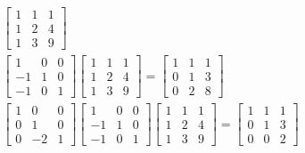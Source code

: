 \begin{gather*}
\left[ \begin{array}{ccc} 1 & 1 & 1 \\ 1 & 2 & 4 \\ 1 & 3 & 9 \end{array} \right] \\
\left[ \begin{array}{ccc} 1 & 0 & 0 \\ -1 & 1 & 0 \\ -1 & 0 & 1 \end{array} \right]
\left[ \begin{array}{ccc} 1 & 1 & 1 \\ 1 & 2 & 4 \\ 1 & 3 & 9 \end{array} \right]
= \left[ \begin{array}{ccc} 1 & 1 & 1 \\ 0 & 1 & 3 \\ 0 & 2 & 8 \end{array} \right] \\
\left[ \begin{array}{ccc} 1 & 0 & 0 \\ 0 & 1 & 0 \\ 0 & -2 & 1 \end{array} \right]
\left[ \begin{array}{ccc} 1 & 0 & 0 \\ -1 & 1 & 0 \\ -1 & 0 & 1 \end{array} \right]
\left[ \begin{array}{ccc} 1 & 1 & 1 \\ 1 & 2 & 4 \\ 1 & 3 & 9 \end{array} \right]
= \left[ \begin{array}{ccc} 1 & 1 & 1 \\ 0 & 1 & 3 \\ 0 & 0 & 2 \end{array} \right]
\end{gather*}

